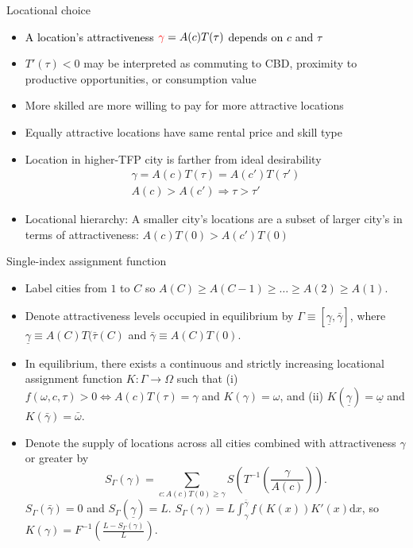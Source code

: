 \documentclass[11pt,notes=hide,aspectratio=169]{beamer}
\begin{document}
\begin{frame}{Locational choice}
\begin{itemize}
\item \textcolor{black}{A location's attractiveness ${\color{red}\gamma}=A(c)T(\tau)$
depends on $c$ and $\tau$}
\item $T'(\tau)<0$ may be interpreted as commuting to CBD, proximity to
productive opportunities, or consumption value
\item More skilled are more willing to pay for more attractive locations
\item Equally attractive locations have same rental price and skill type
\item Location in higher-TFP city is farther from ideal desirability
\begin{align*}
\gamma=A(c)T(\tau)=A(c')T(\tau')\\
A(c)>A(c')\Rightarrow\tau>\tau'
\end{align*}
\item Locational hierarchy: A smaller city's locations are a subset of larger
city's in terms of attractiveness: $A(c)T(0)>A(c')T(0)$ 
\end{itemize}
\end{frame}
\begin{frame}{Single-index assignment function}
\begin{itemize}
\item Label cities from $1$ to $C$ so $A(C)\geq A(C-1)\geq\dots\geq A(2)\geq A(1)$.
\item Denote attractiveness levels occupied in equilibrium by
    $\Gamma\equiv[\underline{\gamma},\bar{\gamma}]$, where $\underline{\gamma}\equiv A(C)T(\bar{\tau}(C)$
    and $\bar{\gamma}\equiv A(C)T(0)$.
\item In equilibrium, there exists a continuous and strictly increasing locational assignment function $K:\Gamma\to\Omega$ such that (i) $f(\omega,c,\tau)>0\iff A(c)T(\tau)=\gamma$ and $K(\gamma)=\omega$, and (ii) $K(\underline{\gamma})=\underline{\omega}$ and $K(\bar{\gamma})=\bar{\omega}$.
\item Denote the supply of locations across all cities combined with
attractiveness $\gamma$ or greater by
\[
S_{\Gamma}(\gamma)=\sum_{c:A(c)T(0)\geq\gamma}S\left(T^{-1}\left(\frac{\gamma}{A(c)}\right)\right).
\]
$S_{\Gamma}(\bar{\gamma})=0$ and $S_{\Gamma}(\underline{\gamma})=L$.
$S_{\Gamma}(\gamma)=L\int_{\gamma}^{\bar{\gamma}}f(K(x))K'(x) \textrm{d} x$,
so $K(\gamma)=F^{-1}\left(\frac{L-S_{\Gamma}(\gamma)}{L}\right)$.
\end{itemize}
\end{frame}
\end{document}
